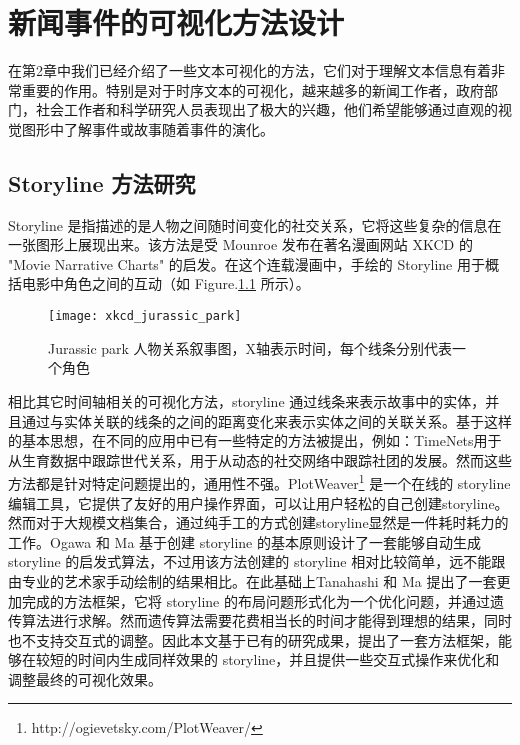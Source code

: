\chapter{新闻事件的可视化方法设计}
在第2章中我们已经介绍了一些文本可视化的方法，它们对于理解文本信息有着非常重要的作用。特别是对于时序文本的可视化，越来越多的新闻工作者，政府部门，社会工作者和科学研究人员表现出了极大的兴趣，他们希望能够通过直观的视觉图形中了解事件或故事随着事件的演化。
\section{Storyline 方法研究}
Storyline 是指描述的是人物之间随时间变化的社交关系，它将这些复杂的信息在一张图形上展现出来。该方法是受 Mounroe 发布在著名漫画网站 XKCD 的 "Movie Narrative Charts" \cite{xkcd657} 的启发。在这个连载漫画中，手绘的 Storyline 用于概括电影中角色之间的互动（如 Figure.\ref{xkcd} 所示）。
\begin{figure}[!htb]
	\centering
		\texttt{[image: xkcd\_jurassic\_park]}
	\caption{Jurassic park 人物关系叙事图，X轴表示时间，每个线条分别代表一个角色}
	\label{xkcd}
\end{figure}
相比其它时间轴相关的可视化方法，storyline 通过线条来表示故事中的实体，并且通过与实体关联的线条的之间的距离变化来表示实体之间的关联关系。基于这样的基本思想，在不同的应用中已有一些特定的方法被提出，例如：TimeNets\cite{Kim:2010:TGD}用于从生育数据中跟踪世代关系，\cite{Reda2011}用于从动态的社交网络中跟踪社团的发展。然而这些方法都是针对特定问题提出的，通用性不强。PlotWeaver\footnote{http://ogievetsky.com/PlotWeaver/} 是一个在线的 storyline 编辑工具，它提供了友好的用户操作界面，可以让用户轻松的自己创建storyline。然而对于大规模文档集合，通过纯手工的方式创建storyline显然是一件耗时耗力的工作。Ogawa 和 Ma \cite{Ogawa:2010} 基于创建 storyline 的基本原则设计了一套能够自动生成 storyline 的启发式算法，不过用该方法创建的 storyline 相对比较简单，远不能跟由专业的艺术家手动绘制的结果相比。在此基础上Tanahashi 和 Ma\cite{tanahashi2012design} 提出了一套更加完成的方法框架，它将 storyline 的布局问题形式化为一个优化问题，并通过遗传算法进行求解。然而遗传算法需要花费相当长的时间才能得到理想的结果，同时也不支持交互式的调整。因此本文基于已有的研究成果，提出了一套方法框架，能够在较短的时间内生成同样效果的 storyline，并且提供一些交互式操作来优化和调整最终的可视化效果。

